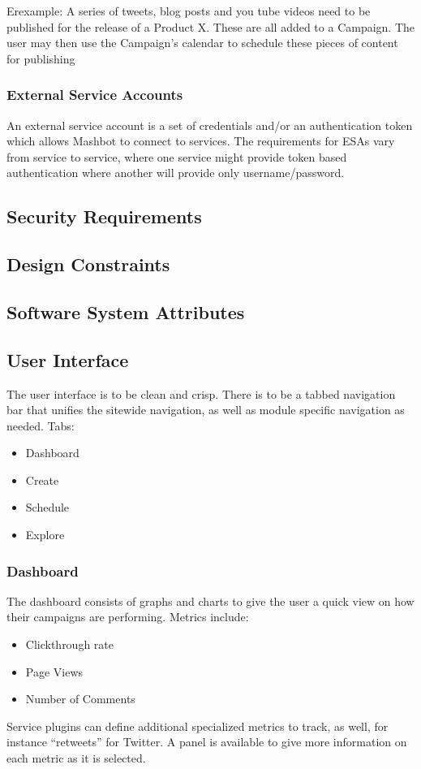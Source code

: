 \documentclass{article}
\begin{document}
				Erexample: A series of tweets, blog posts and you tube videos 
		need to be published for the release of a Product X.  These are all 
		added to a Campaign.  The user may then use the Campaign's calendar to 
		schedule these pieces of content for publishing
		\subsubsection{External Service Accounts} %
                An external service account is a set of credentials and/or an authentication token which allows Mashbot to connect to services.  The requirements for ESAs vary from service to service, where one service might provide token based authentication where another will provide only username/password.
	\subsection{Security Requirements} %
	\subsection{Design Constraints} %
	\subsection{Software System Attributes} %
	\subsection{User Interface} %
        The user interface is to be clean and crisp. There is to be a tabbed navigation bar that unifies the sitewide navigation, as well as module specific navigation as needed.
        Tabs:
        \begin{itemize}
        \item Dashboard
        \item Create
        \item Schedule
        \item Explore
        \end{itemize}
        \subsubsection{Dashboard}
        The dashboard consists of graphs and charts to give the user a quick view on how their campaigns are performing.
        Metrics include:
        \begin{itemize}
        \item Clickthrough rate
        \item Page Views
        \item Number of Comments
        \end{itemize}
        Service plugins can define additional specialized metrics to track, as well, for instance ``retweets'' for Twitter.
        A panel is available to give more information on each metric as it is selected.
\end{document}
